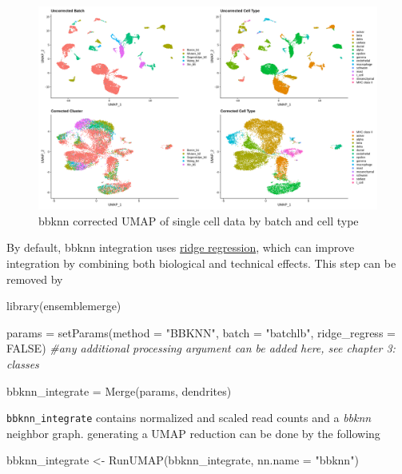 \documentclass[
]{book}
\newenvironment{Shaded}{\begin{snugshade}}{\end{snugshade}}
\newcommand{\AttributeTok}[1]{\textcolor[rgb]{0.77,0.63,0.00}{#1}}
\newcommand{\CommentTok}[1]{\textcolor[rgb]{0.56,0.35,0.01}{\textit{#1}}}
\newcommand{\ConstantTok}[1]{\textcolor[rgb]{0.00,0.00,0.00}{#1}}
\newcommand{\FunctionTok}[1]{\textcolor[rgb]{0.00,0.00,0.00}{#1}}
\newcommand{\NormalTok}[1]{#1}
\newcommand{\OtherTok}[1]{\textcolor[rgb]{0.56,0.35,0.01}{#1}}
\newcommand{\StringTok}[1]{\textcolor[rgb]{0.31,0.60,0.02}{#1}}
\begin{document}
\begin{figure}

{\centering \includegraphics[width=33.33in,height=0.8\textheight]{_book/ensemblemerge_files/images/bbknn_default} 

}

\caption{bbknn corrected UMAP of single cell data by batch and cell type}\label{fig:unnamed-chunk-18}
\end{figure}

By default, bbknn integration uses \href{https://science.sciencemag.org/content/367/6480/eaay3224.abstract}{ridge regression}, which can improve integration by combining both biological and technical effects. This step can be removed by

\begin{Shaded}
\begin{Highlighting}[]
\FunctionTok{library}\NormalTok{(ensemblemerge)}

\NormalTok{params }\OtherTok{=} \FunctionTok{setParams}\NormalTok{(}\AttributeTok{method =} \StringTok{"BBKNN"}\NormalTok{, }\AttributeTok{batch =} \StringTok{"batchlb"}\NormalTok{, }\AttributeTok{ridge\_regress =} \ConstantTok{FALSE}\NormalTok{) }\CommentTok{\#any additional processing argument can be added here, see chapter 3: classes}

\NormalTok{bbknn\_integrate }\OtherTok{=} \FunctionTok{Merge}\NormalTok{(params, dendrites)}
\end{Highlighting}
\end{Shaded}

\texttt{bbknn\_integrate} contains normalized and scaled read counts and a \emph{bbknn} neighbor graph. generating a UMAP reduction can be done by the following

\begin{Shaded}
\begin{Highlighting}[]
\NormalTok{bbknn\_integrate }\OtherTok{\textless{}{-}} \FunctionTok{RunUMAP}\NormalTok{(bbknn\_integrate, }\AttributeTok{nn.name =} \StringTok{"bbknn"}\NormalTok{)}
\end{Highlighting}
\end{Shaded}
\end{document}
